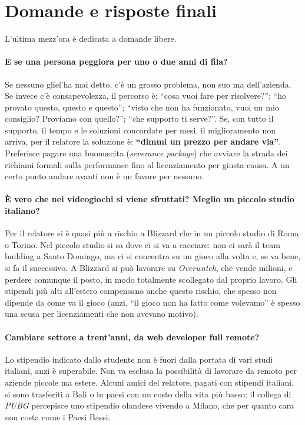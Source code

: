 \section{Domande e risposte finali}
\label{sec:z1-qa-finale}

L'ultima mezz'ora è dedicata a domande libere.

\paragraph{E se una persona peggiora per uno o due anni di fila?} Se nessuno
gliel'ha mai detto, c'è un grosso problema, non suo ma dell'azienda. Se invece
c'è consapevolezza, il percorso è: ``cosa vuoi fare per risolvere?''; ``ho
provato questo, questo e questo''; ``visto che non ha funzionato, vuoi un mio
consiglio? Proviamo con quello?''; ``che supporto ti serve?''. Se, con tutto il
supporto, il tempo e le soluzioni concordate per mesi, il miglioramento non
arriva, per il relatore la soluzione è: \textbf{``dimmi un prezzo per andare
via''}. Preferisce pagare una buonuscita (\emph{severance package}) che
avviare la strada dei richiami formali sulla performance fino al
licenziamento per giusta causa. A un certo punto andare avanti non è un favore
per nessuno.

\paragraph{È vero che nei videogiochi si viene sfruttati? Meglio un piccolo
studio italiano?} Per il relatore si è quasi più a rischio a Blizzard che in un
piccolo studio di Roma o Torino. Nel piccolo studio si sa dove ci si va a
cacciare: non ci sarà il team building a Santo Domingo, ma ci si concentra su
un gioco alla volta e, se va bene, si fa il successivo. A Blizzard si può
lavorare su \emph{Overwatch}, che vende milioni, e perdere comunque il posto,
in modo totalmente scollegato dal proprio lavoro. Gli stipendi più alti
all'estero compensano anche questo rischio, che spesso non dipende da come va
il gioco (anzi, ``il gioco non ha fatto come volevamo'' è spesso una scusa per
licenziamenti che non avevano motivo).

\paragraph{Cambiare settore a trent'anni, da web developer full remote?} Lo
stipendio indicato dallo studente non è fuori dalla portata di vari studi
italiani, anzi è superabile. Non va esclusa la possibilità di lavorare da
remoto per aziende piccole ma estere. Alcuni amici del relatore, pagati con
stipendi italiani, si sono trasferiti a Bali o in paesi con un costo della vita
più basso; il collega di \emph{PUBG} percepisce uno stipendio olandese vivendo
a Milano, che per quanto cara non costa come i Paesi Bassi.

